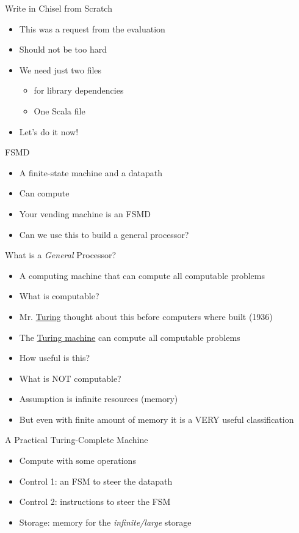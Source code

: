 \begin{frame}[fragile]{Write in Chisel from Scratch}
\begin{itemize}
\item This was a request from the evaluation
\item Should not be too hard
\item We need just two files
\begin{itemize}
\item {} for library dependencies
\item One Scala file
\end{itemize}
\item Let's do it now!
\end{itemize}
\end{frame}

\begin{frame}[fragile]{FSMD}
\begin{itemize}
\item A finite-state machine and a datapath
\item Can compute
\item Your vending machine is an FSMD
\item Can we use this to build a general processor?
\end{itemize}
\end{frame}

\begin{frame}[fragile]{What is a \emph{General} Processor?}
\begin{itemize}
\item A computing machine that can compute all computable problems
\item What is computable?
\item Mr. \href{https://en.wikipedia.org/wiki/Alan_Turing}{Turing} thought about this before computers where built (1936)
\item The \href{https://en.wikipedia.org/wiki/Turing_machine}{Turing machine} can compute all computable problems
\item How useful is this?
\item What is NOT computable?
\item Assumption is infinite resources (memory)
\item But even with finite amount of memory it is a VERY useful classification
\end{itemize}
\end{frame}

\begin{frame}[fragile]{A Practical Turing-Complete Machine}
\begin{itemize}
\item Compute with some operations
\item Control 1: an FSM to steer the datapath
\item Control 2: instructions to steer the FSM
\item Storage: memory for the \emph{infinite/large} storage
\end{itemize}
\end{frame}


